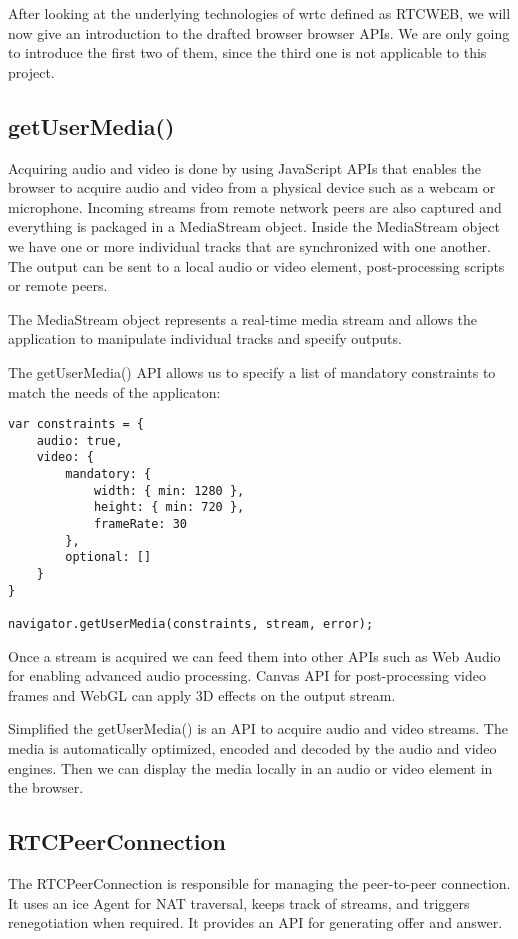 After looking at the underlying technologies of \gls{wrtc} defined as RTCWEB, we will now give an introduction to the drafted browser browser APIs. We are only going to introduce the first two of them, since the third one is not applicable to this project.

\subsection{getUserMedia()}
Acquiring audio and video is done by using JavaScript APIs that enables the browser to acquire audio and video from a physical device such as a webcam or microphone. Incoming streams from remote network peers are also captured and everything is packaged in a MediaStream object. Inside the MediaStream object we have one or more individual tracks that are synchronized with one another. The output can be sent to a local audio or video element, post-processing scripts or remote peers.

The MediaStream object represents a real-time media stream and allows the application to manipulate individual tracks and specify outputs.


The getUserMedia() API allows us to specify a list of mandatory constraints to match the needs of the applicaton:

\lstset{language=Javascript} 
\begin{lstlisting}
var constraints = {
	audio: true,
	video: {
		mandatory: {
			width: { min: 1280 },
			height: { min: 720 },
			frameRate: 30
		},
		optional: []
	}
}

navigator.getUserMedia(constraints, stream, error);
\end{lstlisting}

Once a stream is acquired we can feed them into other APIs such as Web Audio for enabling advanced audio processing. Canvas API for post-processing video frames and WebGL can apply 3D effects on the output stream.

Simplified the getUserMedia() is an API to acquire audio and video streams. The media is automatically optimized, encoded and decoded by the audio and video engines. Then we can display the media locally in an audio or video element in the browser.


\subsection{RTCPeerConnection}
The RTCPeerConnection is responsible for managing the peer-to-peer connection. It uses an \gls{ice} Agent for NAT traversal, keeps track of streams, and triggers renegotiation when required. It provides an API for generating offer and answer.

